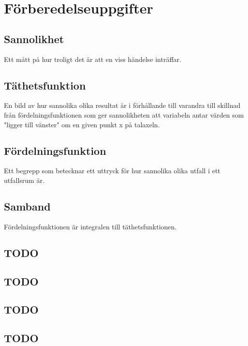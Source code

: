 \documentclass{article}
\begin{document}
\section*{Förberedelseuppgifter}

\addtocounter{section}{1}

\subsection{Sannolikhet}

Ett mått på hur troligt det är att en viss händelse inträffar.

\subsection{Täthetsfunktion}

En bild av hur sannolika olika resultat är i förhållande till varandra till
skillnad från fördelningsfunktionen som ger sannolikheten att variabeln antar
värden som "ligger till vänster" om en given punkt x på talaxeln.

\subsection{Fördelningsfunktion}

Ett begrepp som betecknar ett uttryck för hur sannolika olika utfall i ett
utfallsrum är.

\subsection{Samband}

Fördelningsfunktionen är integralen till täthetsfunktionen.

\addtocounter{section}{1}

\subsection{TODO}
\subsection{TODO}
\subsection{TODO}
\subsection{TODO}
\end{document}

